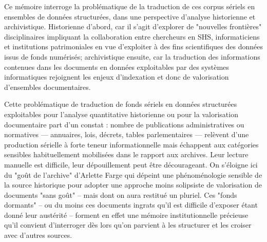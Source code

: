 Ce mémoire interroge la problématique de la traduction de ces corpus sériels en ensembles de données structurées, dans une perspective d’analyse historienne et archivistique. 
Historienne d'abord, car il s'agit d'explorer de "nouvelles frontières" disciplinaires impliquant la collaboration entre chercheurs en SHS, informaticiens et institutions patrimoniales en vue d'exploiter à des fins scientifiques des données issus de fonds numérisés; archivistique ensuite, car la traduction des informations contenues dans les documents en données exploitables par des systèmes informatiques rejoignent les enjeux d'indexation et donc de valorisation d'ensembles documentaires.

Cette problématique de traduction de fonds sériels en données structurées exploitables pour l'analyse quantitative historienne ou pour la valorisation documentaire part d’un constat : nombre de publications administratives ou normatives — annuaires, lois, décrets, tables parlementaires — relèvent d’une production sérielle à forte teneur informationnelle mais échappent aux catégories sensibles habituellement mobilisées dans le rapport aux archives. Leur lecture manuelle est difficile, leur dépouillement peut être décourageant. On s'éloigne ici du "goût de l'archive" d'Arlette Farge qui dépeint une phénoménologie sensible de la source historique pour adopter une approche moins solipsiste de valorisation de documents "sans goût" -- mais dont on aura restitué un pluriel. Ces "fonds dormants" -- ou du moins ces documents ingrats qu'il est difficile d'exposer étant donné leur austérité -- forment en effet une mémoire institutionnelle précieuse qu'il convient d'interroger dès lors qu’on parvient à les structurer et les croiser avec d’autres sources.

